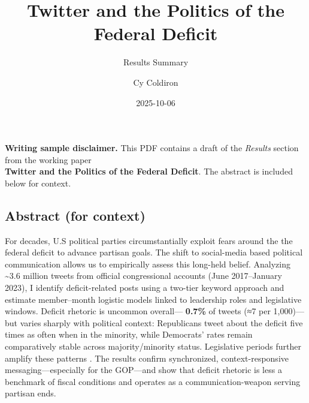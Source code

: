 \documentclass[
]{article}
\title{Twitter and the Politics of the Federal Deficit}
\subtitle{Results Summary}
\author{Cy Coldiron}
\date{2025-10-06}
\renewcommand*\contentsname{Table of contents}
\newcommand\contentsname{Table of contents}
\begin{document}
\maketitle

\renewcommand*\contentsname{Table of contents}
{
\hypersetup{linkcolor=}
\setcounter{tocdepth}{3}
\tableofcontents
}

\begin{tcolorbox}[enhanced jigsaw, colbacktitle=quarto-callout-important-color!10!white, arc=.35mm, bottomtitle=1mm, opacitybacktitle=0.6, title=\textcolor{quarto-callout-important-color}{\faExclamation}\hspace{0.5em}{Important}, rightrule=.15mm, breakable, left=2mm, coltitle=black, leftrule=.75mm, titlerule=0mm, colback=white, colframe=quarto-callout-important-color-frame, toprule=.15mm, toptitle=1mm, opacityback=0, bottomrule=.15mm]

\textbf{Writing sample disclaimer.} This PDF contains a draft of the
\emph{Results} section from the working paper\\
\textbf{Twitter and the Politics of the Federal Deficit}. The abstract
is included below for context.

\end{tcolorbox}

\subsection{Abstract (for context)}\label{abstract-for-context}

For decades, U.S political parties circumstantially exploit fears around
the the federal deficit to advance partisan goals. The shift to
social-media based political communication allows us to empirically
assess this long-held belief. Analyzing \textasciitilde3.6 million
tweets from official congressional accounts (June 2017--January 2023), I
identify deficit-related posts using a two-tier keyword approach and
estimate member--month logistic models linked to leadership roles and
legislative windows. Deficit rhetoric is uncommon overall---
\textbf{0.7\%} of tweets (≈7 per 1,000)---but varies sharply with
political context: Republicans tweet about the deficit five times as
often when in the minority, while Democrats' rates remain comparatively
stable across majority/minority status. Legislative periods further
amplify these patterns . The results confirm synchronized,
context-responsive messaging---especially for the GOP---and show that
deficit rhetoric is less a benchmark of fiscal conditions and operates
as a communication-weapon serving partisan ends.
\end{document}
